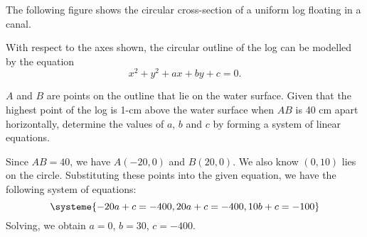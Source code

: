\clearpage
\begin{problem}
    The following figure shows the circular cross-section of a uniform log floating in a canal.

    \begin{center}
    \end{center}
    
    With respect to the axes shown, the circular outline of the log can be modelled by the equation \[x^2 + y^2 + ax + by + c = 0.\]

    $A$ and $B$ are points on the outline that lie on the water surface. Given that the highest point of the log is 1-cm above the water surface when $AB$ is 40 cm apart horizontally, determine the values of $a$, $b$ and $c$ by forming a system of linear equations.
\end{problem}
\begin{solution}
    Since $AB = 40$, we have $A(-20, 0)$ and $B(20, 0)$. We also know $(0, 10)$ lies on the circle. Substituting these points into the given equation, we have the following system of equations: \[\systeme{-20a + c = -400, 20a + c = -400, 10b + c = -100}\] Solving, we obtain $a = 0$, $b = 30$, $c = -400$.
\end{solution}

